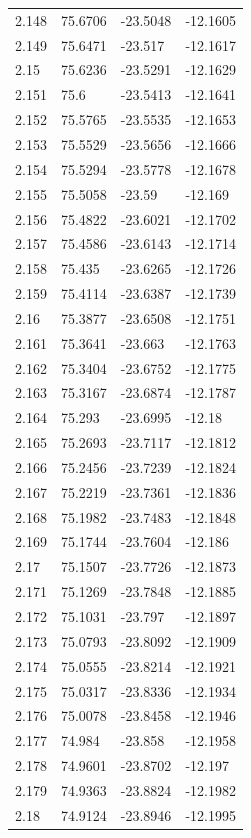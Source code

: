\begin{tabular}{llll}
2.148 & 75.6706 & -23.5048 & -12.1605 \\
2.149 & 75.6471 & -23.517 & -12.1617 \\
2.15 & 75.6236 & -23.5291 & -12.1629 \\
2.151 & 75.6 & -23.5413 & -12.1641 \\
2.152 & 75.5765 & -23.5535 & -12.1653 \\
2.153 & 75.5529 & -23.5656 & -12.1666 \\
2.154 & 75.5294 & -23.5778 & -12.1678 \\
2.155 & 75.5058 & -23.59 & -12.169 \\
2.156 & 75.4822 & -23.6021 & -12.1702 \\
2.157 & 75.4586 & -23.6143 & -12.1714 \\
2.158 & 75.435 & -23.6265 & -12.1726 \\
2.159 & 75.4114 & -23.6387 & -12.1739 \\
2.16 & 75.3877 & -23.6508 & -12.1751 \\
2.161 & 75.3641 & -23.663 & -12.1763 \\
2.162 & 75.3404 & -23.6752 & -12.1775 \\
2.163 & 75.3167 & -23.6874 & -12.1787 \\
2.164 & 75.293 & -23.6995 & -12.18 \\
2.165 & 75.2693 & -23.7117 & -12.1812 \\
2.166 & 75.2456 & -23.7239 & -12.1824 \\
2.167 & 75.2219 & -23.7361 & -12.1836 \\
2.168 & 75.1982 & -23.7483 & -12.1848 \\
2.169 & 75.1744 & -23.7604 & -12.186 \\
2.17 & 75.1507 & -23.7726 & -12.1873 \\
2.171 & 75.1269 & -23.7848 & -12.1885 \\
2.172 & 75.1031 & -23.797 & -12.1897 \\
2.173 & 75.0793 & -23.8092 & -12.1909 \\
2.174 & 75.0555 & -23.8214 & -12.1921 \\
2.175 & 75.0317 & -23.8336 & -12.1934 \\
2.176 & 75.0078 & -23.8458 & -12.1946 \\
2.177 & 74.984 & -23.858 & -12.1958 \\
2.178 & 74.9601 & -23.8702 & -12.197 \\
2.179 & 74.9363 & -23.8824 & -12.1982 \\
2.18 & 74.9124 & -23.8946 & -12.1995 \\

\end{tabular}
